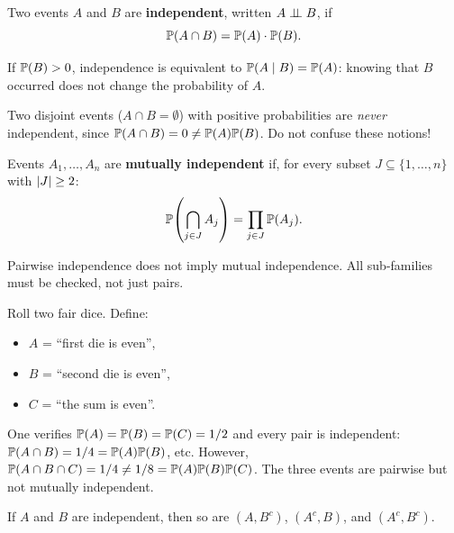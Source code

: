 \begin{definition}
Two events $A$ and $B$ are \textbf{independent}, written $A \perp\!\!\!\perp B$, if
\[
    \mathbb{P}(A \cap B) = \mathbb{P}(A) \cdot \mathbb{P}(B).
\]
\end{definition}

\begin{remark}
If $\mathbb{P}(B) > 0$, independence is equivalent to $\mathbb{P}(A \mid B) = \mathbb{P}(A)$:
knowing that $B$ occurred does not change the probability of $A$.
\end{remark}

\begin{warning}[title=\textbf{Independence $\neq$ disjointness}]
Two disjoint events ($A \cap B = \emptyset$) with positive probabilities are
\emph{never} independent, since $\mathbb{P}(A \cap B) = 0 \neq \mathbb{P}(A)\mathbb{P}(B)$.
Do not confuse these notions!
\end{warning}

\begin{definition}
Events $A_1, \ldots, A_n$ are \textbf{mutually independent} if, for every
subset $J \subseteq \{1, \ldots, n\}$ with $\left| J \right| \geq 2$:
\[
    \mathbb{P}\!\left(\bigcap_{j \in J} A_j\right) = \prod_{j \in J} \mathbb{P}(A_j).
\]
\end{definition}

\begin{warning}[title=\textbf{Pairwise $\neq$ mutual independence}]
Pairwise independence does not imply mutual independence. All sub-families must
be checked, not just pairs.
\end{warning}

\begin{example}
Roll two fair dice. Define:
\begin{itemize}
    \item $A$ = ``first die is even'',
    \item $B$ = ``second die is even'',
    \item $C$ = ``the sum is even''.
\end{itemize}
One verifies $\mathbb{P}(A) = \mathbb{P}(B) = \mathbb{P}(C) = 1/2$ and every pair is independent:
$\mathbb{P}(A \cap B) = 1/4 = \mathbb{P}(A)\mathbb{P}(B)$, etc. However,
$\mathbb{P}(A \cap B \cap C) = 1/4 \neq 1/8 = \mathbb{P}(A)\mathbb{P}(B)\mathbb{P}(C)$.
The three events are pairwise but not mutually independent.
\end{example}

\begin{proposition}
If $A$ and $B$ are independent, then so are $(A, B^c)$, $(A^c, B)$, and
$(A^c, B^c)$.
\end{proposition}

